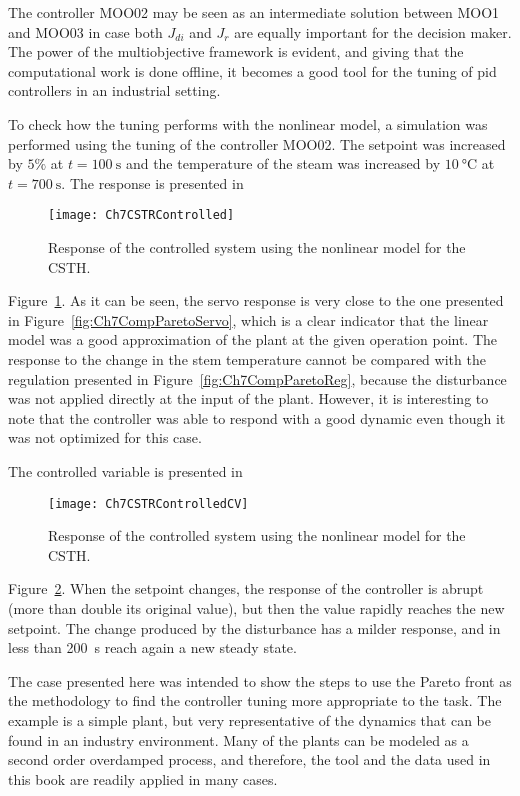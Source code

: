 The controller MOO02 may be seen as an intermediate solution between MOO1 and MOO03 in case both $J_{di}$ and $J_r$ are equally important for the decision maker. The power of the multiobjective framework is evident, and giving that the computational work is done offline, it becomes a good tool for the tuning of \gls{pid} controllers in an industrial setting.

To check how the tuning performs with the nonlinear model, a simulation was performed using the tuning of the controller MOO02. The setpoint was increased by $5\%$ at $t=\SI{100}{\second}$ and the temperature of the steam was increased by $\SI{10}{\celsius}$ at $t=\SI{700}{\second}$. The response is presented in %
\begin{figure}[tb]
	\centering
	\texttt{[image: Ch7CSTRControlled]}
	\caption{Response of the controlled system using the nonlinear model for the CSTH.}
	\label{fig:Ch7CSTRControlled}
\end{figure}
%
Figure~\ref{fig:Ch7CSTRControlled}. As it can be seen, the servo response is very close to the one presented in Figure~\ref{fig:Ch7CompParetoServo}, which is a clear indicator that the linear model was a good approximation of the plant at the given operation point. The response to the change in the stem temperature cannot be compared with the regulation presented in Figure~\ref{fig:Ch7CompParetoReg}, because the disturbance was not applied directly at the input of the plant. However, it is interesting to note that the controller was able to respond with a good dynamic even though it was not optimized for this case.

The controlled variable is presented in %
\begin{figure}[tb]
	\centering
	\texttt{[image: Ch7CSTRControlledCV]}
	\caption{Response of the controlled system using the nonlinear model for the CSTH.}
	\label{fig:Ch7CSTRControlledCV}
\end{figure}
%
Figure~\ref{fig:Ch7CSTRControlledCV}. When the setpoint changes, the response of the controller is abrupt (more than double its original value), but then the value rapidly reaches the new setpoint. The change produced by the disturbance has a milder response, and in less than \SI{200}{\second} reach again a new steady state.

The case presented here was intended to show the steps to use the Pareto front as the methodology to find the controller tuning more appropriate to the task. The example is a simple plant, but very representative of the dynamics that can be found in an industry environment. Many of the plants can be modeled as a second order overdamped process, and therefore, the tool and the data used in this book are readily applied in many cases.

